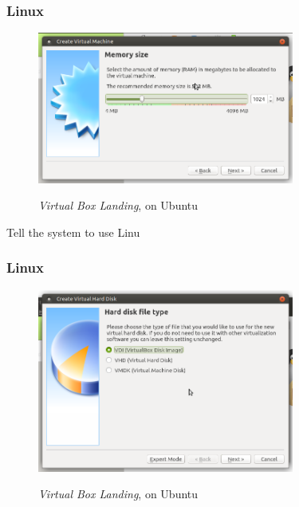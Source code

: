 \subsubsection{Linux}

\begin{figure}[!htb]
    \centering
    \includegraphics[width=0.752\textwidth]{images/00-02.png}\\[0cm]  
    \caption[Virtual Box]{\emph{Virtual Box Landing}, on Ubuntu}
    \label{fig:00-02 - Linux Virtual Box Landing} 
\end{figure}

Tell the system to use Linu
\subsubsection{Linux}

\begin{figure}[!htb]
    \centering
    \includegraphics[width=0.752\textwidth]{images/00-03.png}\\[0cm]  
    \caption[Virtual Box]{\emph{Virtual Box Landing}, on Ubuntu}
    \label{fig:00-03 - Linux Virtual Box Landing} 
\end{figure}

